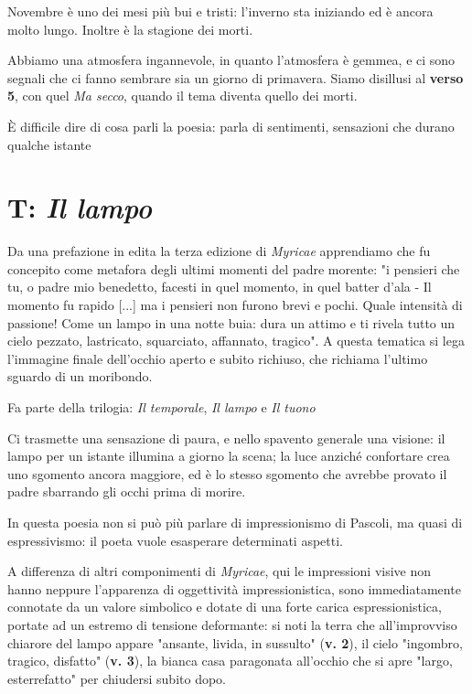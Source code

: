 Novembre è uno dei mesi più bui e tristi: l'inverno sta iniziando ed è ancora molto lungo. Inoltre è la stagione dei morti.

Abbiamo una atmosfera ingannevole, in quanto l'atmosfera è gemmea, e ci sono segnali che ci fanno sembrare sia un giorno di primavera. Siamo disillusi al \textbf{verso 5}, con quel \textit{Ma secco}, quando il tema diventa quello dei morti.

È difficile dire di cosa parli la poesia: parla di sentimenti, sensazioni che durano qualche istante



\section{T: \textit{Il lampo}}

Da una prefazione in edita la terza edizione di \textit{Myricae} apprendiamo che fu concepito come metafora degli ultimi momenti del padre morente: "i pensieri che tu, o padre mio benedetto, facesti in quel momento, in quel batter d'ala - Il momento fu rapido [...] ma i pensieri non furono brevi e pochi. Quale intensità di passione! Come un lampo in una notte buia: dura un attimo e ti rivela tutto un cielo pezzato, lastricato, squarciato, affannato, tragico". A questa tematica si lega l'immagine finale dell'occhio aperto e subito richiuso, che richiama l'ultimo sguardo di un moribondo.

Fa parte della trilogia: \textit{Il temporale}, \textit{Il lampo} e \textit{Il tuono}

Ci trasmette una sensazione di paura, e nello spavento generale una visione: il lampo per un istante illumina a giorno la scena; la luce anziché confortare crea uno sgomento ancora maggiore, ed è lo stesso sgomento che avrebbe provato il padre sbarrando gli occhi prima di morire.

In questa poesia non si può più parlare di impressionismo di Pascoli, ma quasi di espressivismo: il poeta vuole esasperare determinati aspetti.

A differenza di altri componimenti di \textit{Myricae}, qui le impressioni visive non hanno neppure l'apparenza di oggettività impressionistica, sono immediatamente connotate da un valore simbolico e dotate di una forte carica espressionistica, portate ad un estremo di tensione deformante: si noti la terra che all'improvviso chiarore del lampo appare "ansante, livida, in sussulto" (\textbf{v. 2}), il cielo "ingombro, tragico, disfatto" (\textbf{v. 3}), la bianca casa paragonata all'occhio che si apre "largo, esterrefatto" per chiudersi subito dopo.


